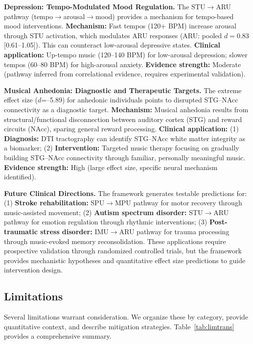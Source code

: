 \documentclass[9pt,onecolumn]{article}
\begin{document}
\textbf{Depression: Tempo-Modulated Mood Regulation.} The STU$\rightarrow$ARU pathway (tempo$\rightarrow$arousal$\rightarrow$mood) provides a mechanism for tempo-based mood interventions. \textbf{Mechanism:} Fast tempos (120+ BPM) increase arousal through STU activation, which modulates ARU responses (ARU: pooled $d=0.83$ [0.61--1.05]). This can counteract low-arousal depressive states. \textbf{Clinical application:} Up-tempo music (120--140 BPM) for low-arousal depression; slower tempos (60--80 BPM) for high-arousal anxiety. \textbf{Evidence strength:} Moderate (pathway inferred from correlational evidence, requires experimental validation).

\textbf{Musical Anhedonia: Diagnostic and Therapeutic Targets.} The extreme effect size ($d$=--5.89) for anhedonic individuals points to disrupted STG--NAcc connectivity as a diagnostic target. \textbf{Mechanism:} Musical anhedonia results from structural/functional disconnection between auditory cortex (STG) and reward circuits (NAcc), sparing general reward processing. \textbf{Clinical application:} (1) \textbf{Diagnosis:} DTI tractography can identify STG--NAcc white matter integrity as a biomarker; (2) \textbf{Intervention:} Targeted music therapy focusing on gradually building STG--NAcc connectivity through familiar, personally meaningful music. \textbf{Evidence strength:} High (large effect size, specific neural mechanism identified).

\textbf{Future Clinical Directions.} The framework generates testable predictions for: (1) \textbf{Stroke rehabilitation:} SPU$\rightarrow$MPU pathway for motor recovery through music-assisted movement; (2) \textbf{Autism spectrum disorder:} STU$\rightarrow$ARU pathway for emotion regulation through rhythmic interventions; (3) \textbf{Post-traumatic stress disorder:} IMU$\rightarrow$ARU pathway for trauma processing through music-evoked memory reconsolidation. These applications require prospective validation through randomized controlled trials, but the framework provides mechanistic hypotheses and quantitative effect size predictions to guide intervention design.

\subsection{Limitations}
\label{sec:limitations}

Several limitations warrant consideration. We organize these by category, provide quantitative context, and describe mitigation strategies. Table~\ref{tab:limtrans} provides a comprehensive summary.
\end{document}
